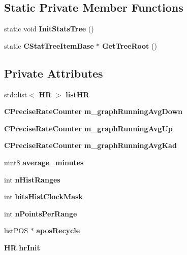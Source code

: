 \subsection*{Static Private Member Functions}
\begin{DoxyCompactItemize}
\item 
static void {\bfseries InitStatsTree} ()\label{classCStatistics_a2fc4207a2d51d9062e66635a4b29a5f9}

\item 
static {\bf CStatTreeItemBase} $\ast$ {\bfseries GetTreeRoot} ()\label{classCStatistics_a2df96fecf85db94e5eaef53a8ee6de62}

\end{DoxyCompactItemize}
\subsection*{Private Attributes}
\begin{DoxyCompactItemize}
\item 
std::list$<$ {\bf HR} $>$ {\bfseries listHR}\label{classCStatistics_a645d26ec4aeb370363d2f249e362100a}

\item 
{\bf CPreciseRateCounter} {\bfseries m\_\-graphRunningAvgDown}\label{classCStatistics_a2a1a97a0dd7432f7d7dd5c72935d5cda}

\item 
{\bf CPreciseRateCounter} {\bfseries m\_\-graphRunningAvgUp}\label{classCStatistics_abdf092981cf3e8def22eae8e5a62add3}

\item 
{\bf CPreciseRateCounter} {\bfseries m\_\-graphRunningAvgKad}\label{classCStatistics_a040e0004084fa96536ac1ca6d36c3378}

\item 
uint8 {\bfseries average\_\-minutes}\label{classCStatistics_a7883f280e7f198a1a1c6799d9812f744}

\item 
int {\bfseries nHistRanges}\label{classCStatistics_afd1139dcc89723ec8107c0e51503adb6}

\item 
int {\bfseries bitsHistClockMask}\label{classCStatistics_a51b3b76b49d59cce0c06a1977327443e}

\item 
int {\bfseries nPointsPerRange}\label{classCStatistics_a60d340b55104670ac15f8ea5e5f33b6e}

\item 
listPOS $\ast$ {\bfseries aposRecycle}\label{classCStatistics_a7c044045834b7d5ffe5f7220fb54bbed}

\item 
{\bf HR} {\bfseries hrInit}\label{classCStatistics_a7e8aabd7163822e3c8fe8b2c48f00f12}

\end{DoxyCompactItemize}
